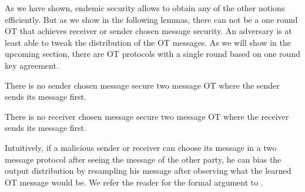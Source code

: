 As we have shown, endemic security allows to obtain any of the other notions efficiently. But as we show in the following lemmas, there can not be a one round OT that achieves receiver or sender chosen message security. An adversary is at least able to tweak the distribution of the OT messages. As we will show in the upcoming section, there are OT protocols with a single round based on one round key agreement.

\begin{lemma}\label{lem:nosendtweak}
There is no sender chosen message secure two message OT where the sender sends its message first. 
\end{lemma}


\begin{lemma}\label{lem:norectweak}
There is no receiver chosen message secure two message OT where the receiver sends its message first.
\end{lemma}

Intuitively, if a malicious sender or receiver can choose its message in a two message protocol after seeing the message of the other party, he can bias the output distribution by resampling his message after observing what the learned OT message would be. We refer the reader for the formal argument to 
.